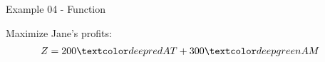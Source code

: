 \begin{frame}{Example 04 - Function}

Maximize Jane's profits:
\Huge{
\begin{align*}
    Z &= 200\colora{AT} + 300\colorb{AM}
\end{align*}
}

\end{frame}
